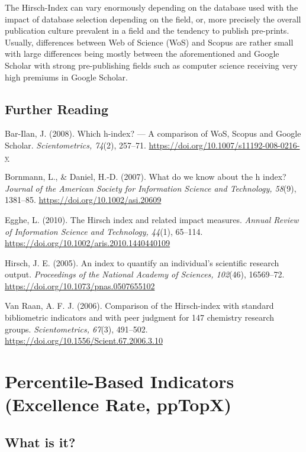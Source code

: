 \documentclass[
  letterpaper,
]{scrreprt}
\begin{document}
The Hirsch-Index can vary enormously depending on the database used with
the impact of database selection depending on the field, or, more
precisely the overall publication culture prevalent in a field and the
tendency to publish pre-prints. Usually, differences between Web of
Science (WoS) and Scopus are rather small with large differences being
mostly between the aforementioned and Google Scholar with strong
pre-publishing fields such as computer science receiving very high
premiums in Google Scholar.

\section{Further Reading}\label{further-reading-8}

Bar-Ilan, J. (2008). Which h-index? --- A comparison of WoS, Scopus and
Google Scholar. \emph{Scientometrics, 74}(2), 257--71.
\url{https://doi.org/10.1007/s11192-008-0216-y}

Bornmann, L., \& Daniel, H.-D. (2007). What do we know about the h
index? \emph{Journal of the American Society for Information Science and
Technology, 58}(9), 1381--85. \url{https://doi.org/10.1002/asi.20609}

Egghe, L. (2010). The Hirsch index and related impact measures.
\emph{Annual Review of Information Science and Technology, 44}(1),
65--114. \url{https://doi.org/10.1002/aris.2010.1440440109}

Hirsch, J. E. (2005). An index to quantify an individual's scientific
research output. \emph{Proceedings of the National Academy of Sciences,
102}(46), 16569--72. \url{https://doi.org/10.1073/pnas.0507655102}

Van Raan, A. F. J. (2006). Comparison of the Hirsch-index with standard
bibliometric indicators and with peer judgment for 147 chemistry
research groups. \emph{Scientometrics, 67}(3), 491--502.
\url{https://doi.org/10.1556/Scient.67.2006.3.10}

\chapter{Percentile-Based Indicators (Excellence Rate,
ppTopX)}\label{percentile-based-indicators-excellence-rate-pptopx}

\section{What is it?}\label{what-is-it-1}
\end{document}
